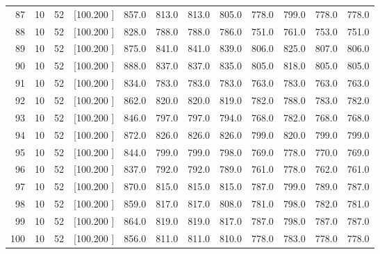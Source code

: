 \documentclass[12pt,a4paper]{article}
\begin{document}
\begin{center}
{\begin{tabular}{r r r r r r r r r r r r}
  87& 10& 52&[100.200   ]&   857.0&   813.0&   813.0&   805.0&   778.0&   799.0&   778.0&   778.0\\[-0.02in]
  88& 10& 52&[100.200   ]&   828.0&   788.0&   788.0&   786.0&   751.0&   761.0&   753.0&   751.0\\[-0.02in]
  89& 10& 52&[100.200   ]&   875.0&   841.0&   841.0&   839.0&   806.0&   825.0&   807.0&   806.0\\[-0.02in]
  90& 10& 52&[100.200   ]&   888.0&   837.0&   837.0&   835.0&   805.0&   818.0&   805.0&   805.0\\[-0.02in]
  91& 10& 52&[100.200   ]&   834.0&   783.0&   783.0&   783.0&   763.0&   783.0&   763.0&   763.0\\[-0.02in]
  92& 10& 52&[100.200   ]&   862.0&   820.0&   820.0&   819.0&   782.0&   788.0&   783.0&   782.0\\[-0.02in]
  93& 10& 52&[100.200   ]&   846.0&   797.0&   797.0&   794.0&   768.0&   782.0&   768.0&   768.0\\[-0.02in]
  94& 10& 52&[100.200   ]&   872.0&   826.0&   826.0&   826.0&   799.0&   820.0&   799.0&   799.0\\[-0.02in]
  95& 10& 52&[100.200   ]&   844.0&   799.0&   799.0&   798.0&   769.0&   778.0&   770.0&   769.0\\[-0.02in]
  96& 10& 52&[100.200   ]&   837.0&   792.0&   792.0&   789.0&   761.0&   778.0&   762.0&   761.0\\[-0.02in]
  97& 10& 52&[100.200   ]&   870.0&   815.0&   815.0&   815.0&   787.0&   799.0&   789.0&   787.0\\[-0.02in]
  98& 10& 52&[100.200   ]&   859.0&   817.0&   817.0&   808.0&   781.0&   798.0&   782.0&   781.0\\[-0.02in]
  99& 10& 52&[100.200   ]&   864.0&   819.0&   819.0&   817.0&   787.0&   798.0&   787.0&   787.0\\[-0.02in]
 100& 10& 52&[100.200   ]&   856.0&   811.0&   811.0&   810.0&   778.0&   783.0&   778.0&   778.0\\[-0.02in]

\hline
\end{tabular}}
\end{center}
\end{document}
